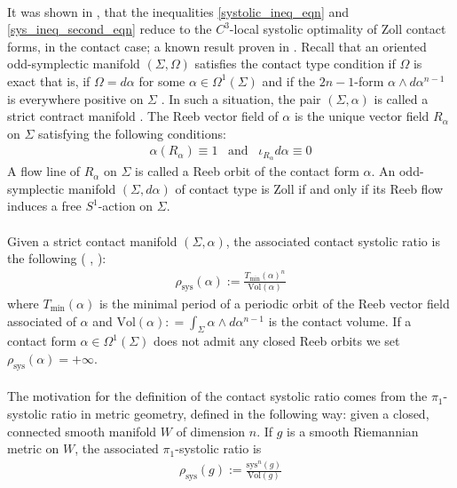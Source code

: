 \documentclass[11pt]{amsart}
\theoremstyle{plain}
\theoremstyle{definition}
\theoremstyle{remark}
\begin{document}
\\
It was shown in \cite{B-K-Odd_Symp}, that the inequalities  \eqref{systolic_ineq_eqn} and \eqref{sys_ineq_second_eqn} reduce to the $C^3$-local systolic optimality of Zoll contact forms, in the contact case; a known result proven in \cite{Abbondandolo-Benedetti}. Recall that an oriented odd-symplectic manifold $(\Sigma,\Omega)$ satisfies the contact type condition if $\Omega$ is exact that is, if $\Omega = d\alpha$ for some $\alpha \in \Omega^1(\Sigma)$ and if the $2n-1$-form $\alpha \wedge d\alpha^{n-1}$ is everywhere positive on $\Sigma$ \cite{WEINSTEIN1979353}. In such a situation, the pair $(\Sigma,\alpha)$ is called a strict contract manifold \cite{Geiges_book}. The Reeb vector field of $\alpha$ is the unique vector field $R_{\alpha}$ on $\Sigma$ satisfying the following conditions:
\begin{align}\label{Reeb_odd-symp_eqn}
    \alpha(R_{\alpha}) \equiv 1 \;\;\; \text{and} \;\;\; \iota_{R_{\alpha}} d\alpha \equiv 0
\end{align}
A flow line of $R_{\alpha}$ on $\Sigma$ is called a Reeb orbit of the contact form $\alpha$. An odd-symplectic manifold $(\Sigma,d\alpha)$ of contact type is Zoll if and only if its Reeb flow induces a free $S^1$-action on $\Sigma$.\\
\\
Given a strict contact manifold $(\Sigma,\alpha)$, the associated contact systolic ratio is the following ( \cite{abhs18}, \cite{APB14}):
\begin{align}\label{contat_sys_ratio_dim_3}
    \rho_{\text{sys}}(\alpha):=  \frac{T_{\text{min}}(\alpha)^{n}}{\text{Vol} (\alpha)}
\end{align}
where $T_{\text{min}}(\alpha)$ is the minimal period of a periodic orbit of the Reeb vector field associated of $\alpha$ and $\mathrm{Vol}(\alpha): = \int_{\Sigma} \alpha \wedge d\alpha^{n-1}$ is the contact volume. If a contact form $\alpha \in \Omega^1(\Sigma)$ does not admit any closed Reeb orbits we set $ \rho_{\text{sys}}(\alpha) = + \infty$.\\
\\
The motivation for the definition of the contact systolic ratio comes from the $\pi_1$-systolic ratio in metric geometry, defined in the following way: given a closed, connected smooth manifold $W$ of dimension $n$. If $g$ is a smooth Riemannian metric on $W$, the associated $\pi_1$-systolic ratio is
\begin{align}\label{metric_sys_ratio}
    \rho_{\text{sys}}(g):= \frac{\text{sys}^n(g)}{\text{Vol}(g)}
\end{align}
\end{document}
